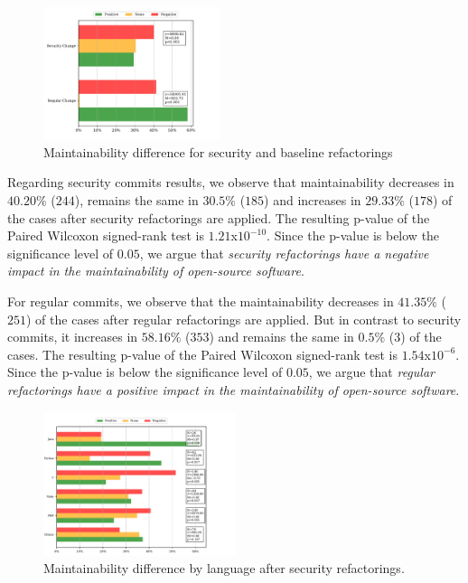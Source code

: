 \documentclass[sigconf,review]{acmart}
\begin{document}
\begin{figure}[h]
	\vspace{-0.2cm}
	
 	\centering 	\includegraphics[width=0.46\textwidth]{figures/maintainability.pdf}
 	\caption{Maintainability difference for security and baseline refactorings}
	\label{fig:secvsreg}
	\vspace{-0.2cm}
	
\end{figure}

Regarding security commits results, we observe that maintainability decreases in
$40.20\%$ ($244$), remains the same in $30.5\%$ ($185$) and increases in $29.33\%$
($178$) of the cases after security refactorings are applied. The resulting
p-value of the Paired Wilcoxon signed-rank test is $1.21$x$10^{-10}$.
Since the p-value is below the significance level of $0.05$, we argue that
\emph{security refactorings have a negative impact in the maintainability of
open-source software}.

For regular commits, we observe that the maintainability decreases in $41.35\%$
($251$) of the cases after regular refactorings are applied. But in contrast
to security commits, it increases in $58.16\%$ ($353$) and remains the same in
$0.5\%$ ($3$) of the cases. The resulting p-value of the Paired Wilcoxon signed-rank
test is $1.54$x$10^{-6}$. Since the p-value is below the significance level of
$0.05$, we argue that \emph{regular refactorings have a
positive impact in the maintainability of open-source software}.

\begin{figure}[h]
\vspace{-0.2cm}
  \centering
  \includegraphics[width=0.5\textwidth]{figures/language.pdf}
  \caption{Maintainability difference by language after security refactorings.}
  \label{fig:lang_main}
  \vspace{-0.2cm}
  
\end{figure}
\end{document}
